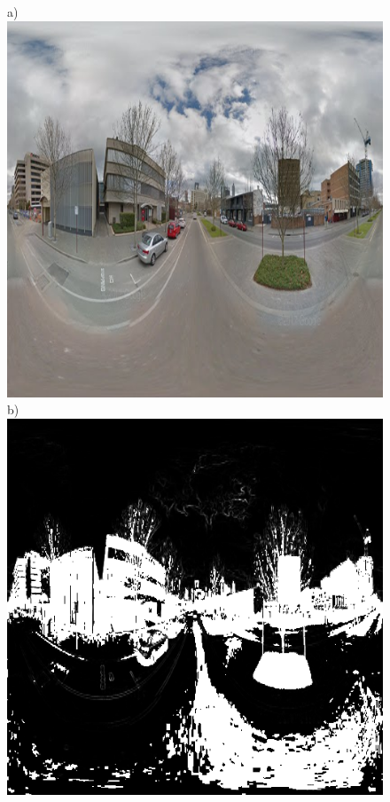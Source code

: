 \documentclass[final,3p,times,authoryear]{elsarticle}
\begin{document}
\begin{figure}
\centering    
a)\includegraphics[scale=0.25]{Images/FloodfillInput.png}
b)\includegraphics[scale=0.25]{Images/FloodfillMiddle.png}

\end{figure}
\end{document}
